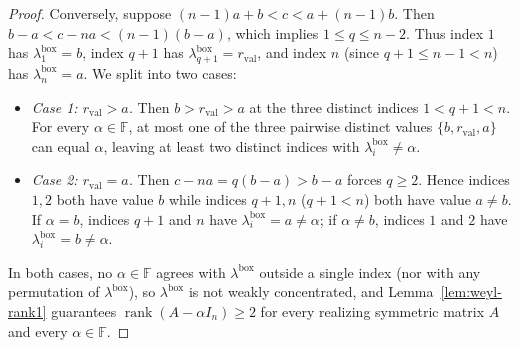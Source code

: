 \documentclass[11pt]{article}
\theoremstyle{definition}
\theoremstyle{remark}
\newcommand{\rk}{\operatorname{rank}}
\begin{document}
\begin{proof}
Conversely, suppose $(n-1)a + b < c < a + (n-1)b$. Then $b - a < c - n a < (n - 1)(b - a)$, which implies $1 \le q \le n - 2$. Thus index $1$ has $\lambda_1^{\mathrm{box}} = b$, index $q + 1$ has $\lambda_{q+1}^{\mathrm{box}} = r_{\mathrm{val}}$, and index $n$ (since $q + 1 \le n - 1 < n$) has $\lambda_n^{\mathrm{box}} = a$. We split into two cases:
\begin{itemize}
  \item \emph{Case 1: $r_{\mathrm{val}} > a$.} Then $b > r_{\mathrm{val}} > a$ at the three distinct indices $1 < q + 1 < n$. For every $\alpha \in \mathbb{F}$, at most one of the three pairwise distinct values $\{b, r_{\mathrm{val}}, a\}$ can equal $\alpha$, leaving at least two distinct indices with $\lambda_i^{\mathrm{box}} \neq \alpha$.
  \item \emph{Case 2: $r_{\mathrm{val}} = a$.} Then $c - n a = q(b - a) > b - a$ forces $q \ge 2$. Hence indices $1, 2$ both have value $b$ while indices $q + 1, n$ ($q + 1 < n$) both have value $a \neq b$. If $\alpha = b$, indices $q + 1$ and $n$ have $\lambda_i^{\mathrm{box}} = a \neq \alpha$; if $\alpha \neq b$, indices $1$ and $2$ have $\lambda_i^{\mathrm{box}} = b \neq \alpha$.
\end{itemize}
In both cases, no $\alpha \in \mathbb{F}$ agrees with $\lambda^{\mathrm{box}}$ outside a single index (nor with any permutation of $\lambda^{\mathrm{box}}$), so $\lambda^{\mathrm{box}}$ is not weakly concentrated, and Lemma~\ref{lem:weyl-rank1} guarantees $\rk(A - \alpha I_n) \ge 2$ for every realizing symmetric matrix $A$ and every $\alpha \in \mathbb{F}$.
\end{proof}
\end{document}
